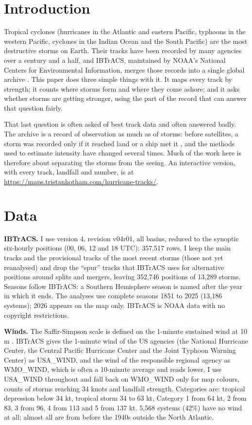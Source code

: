\documentclass[11pt,a4paper]{article}
\begin{document}
\section{Introduction}
Tropical cyclones (hurricanes in the Atlantic and eastern Pacific, typhoons in the western Pacific, cyclones in the Indian Ocean and the South Pacific) are the most destructive storms on Earth. Their tracks have been recorded by many agencies over a century and a half, and IBTrACS, maintained by NOAA's National Centers for Environmental Information, merges those records into a single global archive \citep{knapp2010,gahtan2024}. This paper does three simple things with it. It maps every track by strength; it counts where storms form and where they come ashore; and it asks whether storms are getting stronger, using the part of the record that can answer that question fairly.

That last question is often asked of best track data and often answered badly. The archive is a record of observation as much as of storms: before satellites, a storm was recorded only if it reached land or a ship met it \citep{wikitc}, and the methods used to estimate intensity have changed several times. Much of the work here is therefore about separating the storms from the seeing. An interactive version, with every track, landfall and number, is at \url{https://maps.tristanhotham.com/hurricane-tracks/}.

\section{Data}
\textbf{IBTrACS.} I use version 4, revision v04r01, all basins, reduced to the synoptic six-hourly positions (00, 06, 12 and 18 UTC): 357,517 rows. I keep the main tracks and the provisional tracks of the most recent storms (those not yet reanalysed) and drop the ``spur'' tracks that IBTrACS uses for alternative positions around splits and mergers, leaving 352,746 positions of 13,289 storms. Seasons follow IBTrACS: a Southern Hemisphere season is named after the year in which it ends. The analyses use complete seasons 1851 to 2025 (13,186 systems); 2026 appears on the map only. IBTrACS is NOAA data with no copyright restrictions.

\textbf{Winds.} The Saffir-Simpson scale is defined on the 1-minute sustained wind at 10 m \citep{wikiss}. IBTrACS gives the 1-minute wind of the US agencies (the National Hurricane Center, the Central Pacific Hurricane Center and the Joint Typhoon Warning Center) as USA\_WIND, and the wind of the responsible regional agency as WMO\_WIND, which is often a 10-minute average and reads lower. I use USA\_WIND throughout and fall back on WMO\_WIND only for map colours, counts of storms reaching 34 knots and landfall strength. Categories are: tropical depression below 34 kt, tropical storm 34 to 63 kt, Category 1 from 64 kt, 2 from 83, 3 from 96, 4 from 113 and 5 from 137 kt. 5,568 systems (42\%) have no wind at all; almost all are from before the 1940s outside the North Atlantic.
\end{document}
